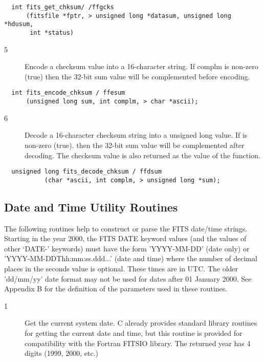\documentclass[11pt]{book}
\begin{document}
\begin{verbatim}
  int fits_get_chksum/ /ffgcks
      (fitsfile *fptr, > unsigned long *datasum, unsigned long *hdusum,
       int *status)
\end{verbatim}

\begin{description}
\item[5 ] Encode a checksum value
    into a 16-character string.  If complm is non-zero (true) then the 32-bit
   sum value will be complemented before encoding. \label{ffesum}
\end{description}

\begin{verbatim}
  int fits_encode_chksum / ffesum
      (unsigned long sum, int complm, > char *ascii);
\end{verbatim}

\begin{description}
\item[6 ] Decode a 16-character checksum string into a unsigned long value.
    If is non-zero (true). then the 32-bit sum value will be complemented
    after decoding.  The checksum value is also returned as the
   value of the function. \label{ffdsum}
\end{description}

\begin{verbatim}
  unsigned long fits_decode_chksum / ffdsum
           (char *ascii, int complm, > unsigned long *sum);
\end{verbatim}


\subsection{Date and Time Utility Routines}

The following routines help to construct or parse the FITS date/time
strings.   Starting in the year 2000, the FITS DATE keyword values (and
the values of other `DATE-' keywords) must have the form 'YYYY-MM-DD'
(date only) or 'YYYY-MM-DDThh:mm:ss.ddd...' (date and time) where the
number of decimal places in the seconds value is optional.  These times
are in UTC.  The older 'dd/mm/yy' date format may not be used for dates
after 01 January 2000.  See Appendix B for the definition of the
parameters used in these routines.


\begin{description}
\item[1 ] Get the current system date.  C already provides standard
    library routines for getting the current date and time,
    but this routine is provided for compatibility with
    the Fortran FITSIO library.  The returned year has 4 digits
    (1999, 2000, etc.) \label{ffgsdt}
\end{description}
\end{document}
